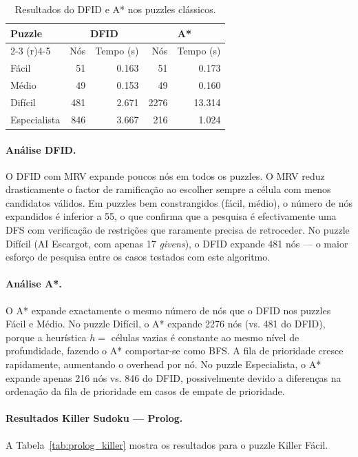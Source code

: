 \begin{table}[ht]
    \caption{Resultados do DFID e A* nos puzzles clássicos.}
    \label{tab:prolog_classic}
    \centering
    \begin{tabular}{lrrrr}
        \toprule
        \textbf{Puzzle} & \multicolumn{2}{c}{\textbf{DFID}} & \multicolumn{2}{c}{\textbf{A*}} \\
        \cmidrule(r){2-3} \cmidrule(r){4-5}
        & Nós & Tempo (s) & Nós & Tempo (s) \\
        \midrule
        Fácil    &    51 & 0.163 &    51 & 0.173 \\
        Médio    &    49 & 0.153 &    49 & 0.160 \\
        Difícil  &   481 & 2.671 &  2276 & 13.314 \\
        Especialista &  846 & 3.667 &   216 & 1.024 \\
        \bottomrule
    \end{tabular}
\end{table}

\paragraph{Análise DFID.}
O DFID com MRV expande poucos nós em todos os puzzles. O MRV reduz drasticamente o factor de ramificação ao escolher sempre a célula com menos candidatos válidos. Em puzzles bem constrangidos (fácil, médio), o número de nós expandidos é inferior a 55, o que confirma que a pesquisa é efectivamente uma DFS com verificação de restrições que raramente precisa de retroceder. No puzzle Difícil (AI Escargot, com apenas 17 \emph{givens}), o DFID expande 481 nós — o maior esforço de pesquisa entre os casos testados com este algoritmo.

\paragraph{Análise A*.}
O A* expande exactamente o mesmo número de nós que o DFID nos puzzles Fácil e Médio. No puzzle Difícil, o A* expande 2276 nós (vs. 481 do DFID), porque a heurística $h = $ células vazias é constante ao mesmo nível de profundidade, fazendo o A* comportar-se como BFS. A fila de prioridade cresce rapidamente, aumentando o overhead por nó. No puzzle Especialista, o A* expande apenas 216 nós vs. 846 do DFID, possivelmente devido a diferenças na ordenação da fila de prioridade em casos de empate de prioridade.

\paragraph{Resultados Killer Sudoku — Prolog.}
A Tabela~\ref{tab:prolog_killer} mostra os resultados para o puzzle Killer Fácil.

